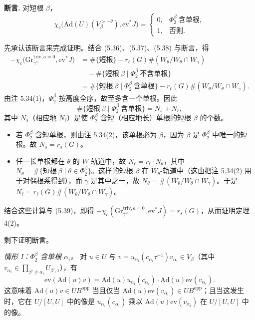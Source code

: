\medskip\noindent\textbf{断言.} 对短根 $\beta$，
\[
\chi_c\big(\mathrm{Ad}(U)(V^{>-\theta}_\beta),\mathrm{ev}^*J\big)=
\begin{cases}
0,&\Phi^\beta_2\ \text{含单根},\\
1,&\text{否则}.
\end{cases}
\]

先承认该断言来完成证明。结合 (5.36)、(5.37)、(5.38) 与断言，得
\begin{equation}
\begin{aligned}
-\chi_c\big(\mathrm{Gr}^{\mathrm{triv},a=0}_{\gamma^\vee},\mathrm{ev}^*J\big)
&=\#\{\text{短根}\}-r_\ell(G)\#(W_\theta/W_\theta\cap W_\gamma)\\
&\quad-\#\{\text{短根}\ \beta\mid\Phi^\beta_2\ \text{不含单根}\}\\
&=\#\{\text{短根}\ \beta\mid\Phi^\beta_2\ \text{含单根}\}-r_\ell(G)\#(W_\theta/W_\theta\cap W_\gamma).
\end{aligned}
\end{equation}
由注 5.34(1)，$\Phi^\beta_2$ 按高度全序，故至多含一个单根。因此
\[
\#\{\text{短根}\ \beta\mid\Phi^\beta_2\ \text{含单根}\}=N_s+N_\ell,
\]
其中 $N_s$（相应地 $N_\ell$）是使 $\Phi^\beta_2$ 含短（相应地长）单根的短根 $\beta$ 的个数。
\begin{itemize}[leftmargin=1.6em, itemsep=.2em]
\item 若 $\Phi^\beta_2$ 含短单根，则由注 5.34(2)，该单根必为 $\beta$，因为 $\beta$ 是 $\Phi^\beta_2$ 中唯一的短根。故 $N_s=r_s(G)$。
\item 任一长单根都在 $\theta$ 的 $W$-轨道中，故 $N_\ell=r_\ell\cdot N_\theta$，其中 $N_\theta=\#\{\text{短根}\ \beta\mid\theta\in\Phi^\beta_2\}$。这样的短根 $\beta$ 在 $W_\theta$-轨道中（这由把注 5.34(2) 用于对偶根系得到），而 $\gamma$ 是其中之一，故 $N_\theta=\#(W_\theta/W_\theta\cap W_\gamma)$。于是 $N_\ell=r_\ell(G)\#(W_\theta/W_\theta\cap W_\gamma)$。
\end{itemize}
结合这些计算与 (5.39)，即得 $-\chi_c(\mathrm{Gr}^{\mathrm{triv},a=0}_{\gamma^\vee},\mathrm{ev}^*J)=r_s(G)$，从而证明定理 4(2)。

剩下证明断言。

\emph{情形 I：$\Phi^\beta_2$ 含单根 $\alpha_i$。} 对 $u\in U$ 与 $v=u_{\alpha_i}(c_{\alpha_i}\tau^{-1})v_{\alpha_i}\in V_\beta$（其中 $v_{\alpha_i}\in\prod_{\beta'\neq\alpha_i}U_{\beta',1}$），有
\[
\mathrm{ev}(\mathrm{Ad}(u)v)=\mathrm{Ad}(u)u_{\alpha_i}(c_{\alpha_i})\cdot\mathrm{Ad}(u)\mathrm{ev}(v_{\alpha_i}).
\]
这意味着 $\mathrm{Ad}(u)v\in UB^{\mathrm{opp}}$ 当且仅当 $\mathrm{Ad}(u)\mathrm{ev}(v_{\alpha_i})\in UB^{\mathrm{opp}}$；且当这发生时，它在 $U/[U,U]$ 中的像是 $u_{\alpha_i}(c_{\alpha_i})$ 乘以 $\mathrm{Ad}(u)\mathrm{ev}(v_{\alpha_i})$ 在 $U/[U,U]$ 中的像。

